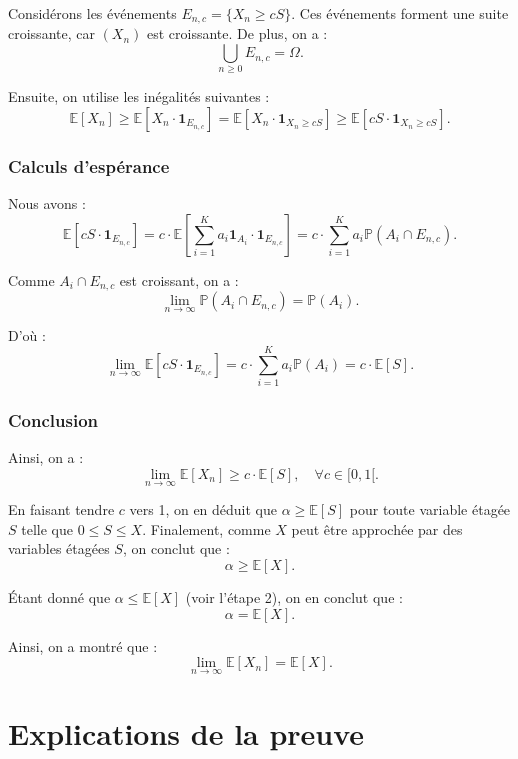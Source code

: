 Considérons les événements \( E_{n,c} = \{X_n \geq cS\} \). Ces événements forment une suite croissante, car \( (X_n) \) est croissante. De plus, on a :
$$ \bigcup_{n \geq 0} E_{n,c} = \Omega. $$

Ensuite, on utilise les inégalités suivantes :
\[
\mathbb{E}[X_n] \geq \mathbb{E}[X_n \cdot \mathbf{1}_{E_{n,c}}] = \mathbb{E}[X_n \cdot \mathbf{1}_{X_n \geq cS}] \geq \mathbb{E}[cS \cdot \mathbf{1}_{X_n \geq cS}].
\]

\subsubsection*{Calculs d'espérance}

Nous avons :
\[
\mathbb{E}[cS \cdot \mathbf{1}_{E_{n,c}}] = c \cdot \mathbb{E}\left[\sum_{i=1}^K a_i \mathbf{1}_{A_i} \cdot \mathbf{1}_{E_{n,c}}\right] 
= c \cdot \sum_{i=1}^K a_i \mathbb{P}(A_i \cap E_{n,c}).
\]

Comme \( A_i \cap E_{n,c} \) est croissant, on a :
\[
\lim_{n \to \infty} \mathbb{P}(A_i \cap E_{n,c}) = \mathbb{P}(A_i).
\]

D'où :
\[
\lim_{n \to \infty} \mathbb{E}[cS \cdot \mathbf{1}_{E_{n,c}}] = c \cdot \sum_{i=1}^K a_i \mathbb{P}(A_i) = c \cdot \mathbb{E}[S].
\]

\subsubsection*{Conclusion}

Ainsi, on a :
\[
\lim_{n \to \infty} \mathbb{E}[X_n] \geq c \cdot \mathbb{E}[S], \quad \forall c \in [0, 1[.
\]

En faisant tendre \( c \) vers 1, on en déduit que \( \alpha \geq \mathbb{E}[S] \) pour toute variable étagée \( S \) telle que \( 0 \leq S \leq X \). Finalement, comme \( X \) peut être approchée par des variables étagées \( S \), on conclut que :
$$ \alpha \geq \mathbb{E}[X]. $$

Étant donné que \( \alpha \leq \mathbb{E}[X] \) (voir l'étape 2), on en conclut que :
$$ \alpha = \mathbb{E}[X]. $$

Ainsi, on a montré que :
$$ \lim_{n \to \infty} \mathbb{E}[X_n] = \mathbb{E}[X]. $$

\epf

\section*{Explications de la preuve}

